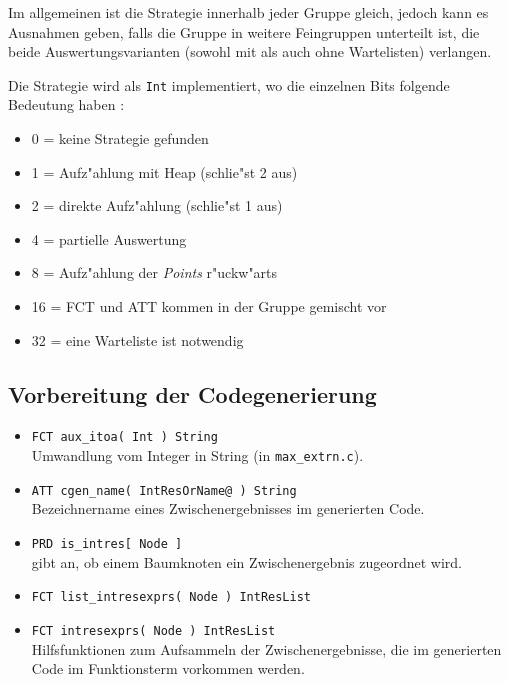 Im allgemeinen ist die Strategie innerhalb jeder Gruppe gleich,
jedoch kann es Ausnahmen geben,
falls die Gruppe in weitere Feingruppen unterteilt ist,
die beide Auswertungsvarianten (sowohl mit als auch ohne Wartelisten) verlangen.

Die Strategie wird als {\tt Int} implementiert, wo die einzelnen Bits folgende
Bedeutung haben :

\begin{itemize}

\item 0 = keine Strategie gefunden
\item 1 = Aufz"ahlung mit Heap (schlie"st 2 aus)
\item 2 = direkte Aufz"ahlung (schlie"st 1 aus)

\item 4 = partielle Auswertung

\item 8 = Aufz"ahlung der {\it Points} r"uckw"arts

\item 16 = FCT und ATT kommen in der Gruppe gemischt vor

\item 32 = eine Warteliste ist notwendig
\end{itemize}

\subsection{Vorbereitung der Codegenerierung}


\begin{itemize}
\item {\tt FCT aux\_itoa( Int ) String}\\
Umwandlung vom Integer in String (in {\tt max\_extrn.c}).

\item {\tt ATT cgen\_name( IntResOrName@ ) String}\\
Bezeichnername eines Zwischenergebnisses im generierten Code.

\item {\tt PRD is\_intres[ Node ]}\\
gibt an, ob einem Baumknoten ein Zwischenergebnis zugeordnet wird.

\item {\tt FCT  list\_intresexprs( Node ) IntResList}
\item {\tt FCT  intresexprs( Node ) IntResList}\\
Hilfsfunktionen zum Aufsammeln der Zwischenergebnisse, die im generierten
Code im Funktionsterm vorkommen werden.
\end{itemize}



